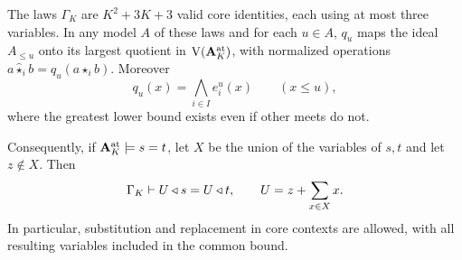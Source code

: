 \begin{proposition}
\label{core:prop:atomic-uniform-lift}
The laws $\Gamma_K$ are $K^2+3K+3$ valid core identities, each using at most three
variables. In any model $A$ of these laws and for each $u\in A$,
$q_u$ maps the ideal $A_{\leq u}$ onto its largest quotient in
$\operatorname V(\mathbf A_K^{\rm at})$, with normalized operations
$a\mathbin{\widehat\star_i}b=q_u(a\star_i b)$. Moreover
\begin{equation}\label{core:eq:atomic-closure-meet}
 q_u(x)=\bigwedge_{i\in I}e_i^u(x)\qquad(x\leq u),
\end{equation}
where the greatest lower bound exists even if other meets do not.

Consequently, if $\mathbf A_K^{\rm at}\models s=t$, let $X$ be the
union of the variables of $s,t$ and let $z\notin X$. Then
\begin{equation}\label{core:eq:atomic-bounded-lift}
 \Gamma_K\vdash U\mathbin{\triangleleft} s=U\mathbin{\triangleleft} t,
 \qquad U=z+\sum_{x\in X}x.
\end{equation}
In particular, substitution and replacement in core contexts are allowed,
with all resulting variables included in the common bound.
\end{proposition}
